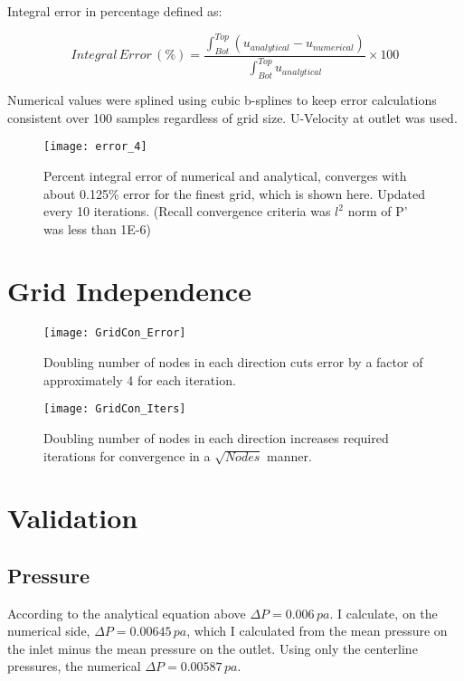 \documentclass[10pt,english]{article}
\begin{document}
\noindent Integral error in percentage defined as:

    \begin{equation}
       Integral\,Error\,(\%) = \frac{\int_{Bot}^{Top}{(u_{analytical}-u_{numerical})}}{\int_{Bot}^{Top}{u_{analytical}}} \times 100
    \end{equation}
    
\noindent Numerical values were splined using cubic b-splines to keep error calculations consistent over 100 samples regardless of grid size.  U-Velocity at outlet was used.


\begin{figure}[H]
\centering
\texttt{[image: error\_4]}
\vspace{-5pt}
\caption{Percent integral error of numerical and analytical, converges with about 0.125\% error for the finest grid, which is shown here. Updated every 10 iterations. (Recall convergence criteria was $l^2$ norm of P' was less than 1E-6)}
\label{f:3b}
\end{figure}

\FloatBarrier
\vspace{5pt}
\section{Grid Independence}


\begin{figure}[H]
\centering
\texttt{[image: GridCon\_Error]}
\vspace{-5pt}
\caption{Doubling number of nodes in each direction cuts error by a factor of approximately 4 for each iteration.}
\label{f:3b}
\end{figure}


\begin{figure}[H]
\centering
\texttt{[image: GridCon\_Iters]}
\vspace{-5pt}
\caption{Doubling number of nodes in each direction increases required iterations for convergence in a $\sqrt{Nodes}$ manner.}
\label{f:3b}
\end{figure}

\section{Validation}

\subsection{Pressure}
According to the analytical equation above  $\Delta P = 0.006\,pa$.  I calculate, on the numerical side, $\Delta P = 0.00645\,pa$, which I calculated from the mean pressure on the inlet minus the mean pressure on the outlet.  Using only the centerline pressures, the numerical $\Delta P = 0.00587\,pa$.\\
\end{document}
